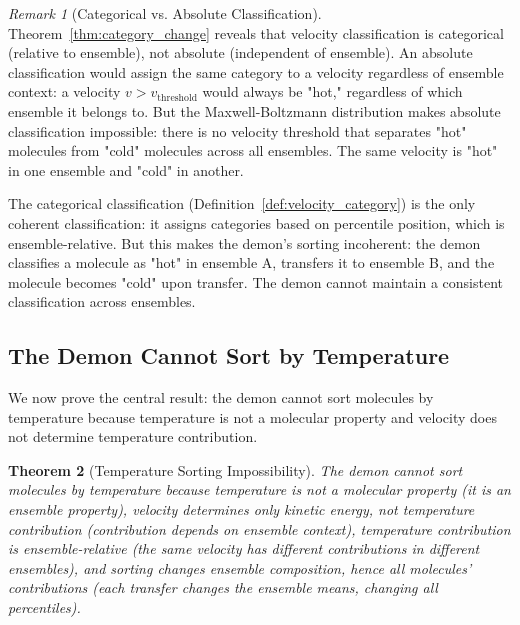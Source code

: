 \documentclass[12pt,a4paper]{article}
\newtheorem{theorem}{Theorem}[section]
\theoremstyle{definition}
\theoremstyle{remark}
\newtheorem{remark}[theorem]{Remark}
\begin{document}
\begin{remark}[Categorical vs. Absolute Classification]
\label{rem:categorical_absolute}
Theorem~\ref{thm:category_change} reveals that velocity classification is categorical (relative to ensemble), not absolute (independent of ensemble). An absolute classification would assign the same category to a velocity regardless of ensemble context: a velocity $v > v_{\text{threshold}}$ would always be "hot," regardless of which ensemble it belongs to. But the Maxwell-Boltzmann distribution makes absolute classification impossible: there is no velocity threshold that separates "hot" molecules from "cold" molecules across all ensembles. The same velocity is "hot" in one ensemble and "cold" in another.

The categorical classification (Definition~\ref{def:velocity_category}) is the only coherent classification: it assigns categories based on percentile position, which is ensemble-relative. But this makes the demon's sorting incoherent: the demon classifies a molecule as "hot" in ensemble A, transfers it to ensemble B, and the molecule becomes "cold" upon transfer. The demon cannot maintain a consistent classification across ensembles.
\end{remark}

\subsection{The Demon Cannot Sort by Temperature}

We now prove the central result: the demon cannot sort molecules by temperature because temperature is not a molecular property and velocity does not determine temperature contribution.

\begin{theorem}[Temperature Sorting Impossibility]
\label{thm:temp_sort_impossible}
The demon cannot sort molecules by temperature because temperature is not a molecular property (it is an ensemble property), velocity determines only kinetic energy, not temperature contribution (contribution depends on ensemble context), temperature contribution is ensemble-relative (the same velocity has different contributions in different ensembles), and sorting changes ensemble composition, hence all molecules' contributions (each transfer changes the ensemble means, changing all percentiles).
\end{theorem}
\end{document}
